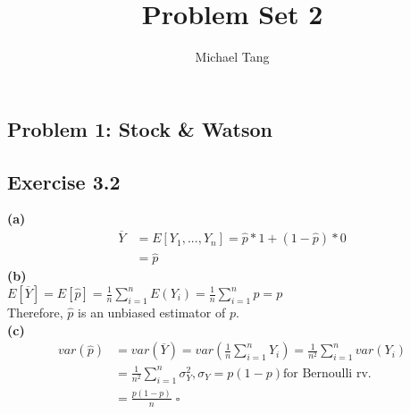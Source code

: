 \documentclass[fleqn]{article}
\title{Problem Set 2}
\author{Michael Tang}
\begin{document}
\maketitle
{}
\begin{adjustwidth}{-2cm}{-2cm}

\section{Problem 1: Stock \& Watson}
\subsection{Exercise 3.2}
\textbf{(a)}
\begin{align*}
\overline{Y} &= E\left[Y_{1},...,Y_{n}\right] = \hat{p}*1 + \left(1-\hat{p}\right)*0\\
&= \hat{p}
\end{align*}
\textbf{(b)}\\
$E\left[\overline{Y}\right] = E\left[\hat{p}\right] = \frac{1}{n}\sum_{i=1}^{n}E\left(Y_{i}\right) = \frac{1}{n}\sum_{i=1}^{n}p = p$\\
Therefore, $\hat{p}$ is an unbiased estimator of $p$.\\
\textbf{(c)}
\begin{align*}
var\left(\hat{p}\right) &= var\left(\overline{Y}\right) = var\left(\frac{1}{n}\sum_{i=1}^{n}Y_{i}\right) = \frac{1}{n^{2}}\sum_{i=1}^{n}var\left(Y_{i}\right)\\
&= \frac{1}{n^{2}}\sum_{i=1}^{n}\sigma_{Y}^2, \sigma_{Y} = p\left(1-p\right) \text{for Bernoulli rv.}\\
&= \frac{p\left(1-p\right)}{n}  \; \square
\end{align*}

\end{adjustwidth}
\end{document}
